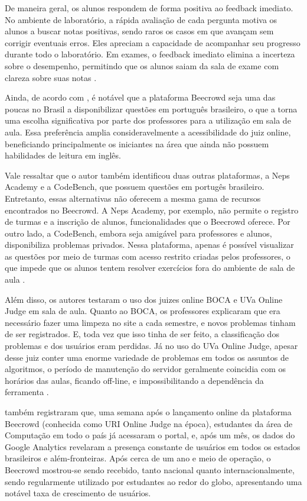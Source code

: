De maneira geral, os alunos respondem de forma positiva ao feedback imediato. No ambiente de laboratório, a rápida avaliação de cada pergunta motiva os alunos a buscar notas positivas, sendo raros os casos em que avançam sem corrigir eventuais erros. Eles apreciam a capacidade de acompanhar seu progresso durante todo o laboratório. Em exames, o feedback imediato elimina a incerteza sobre o desempenho, permitindo que os alunos saiam da sala de exame com clareza sobre suas notas \cite[p.~49]{lobbharlow}. 

Ainda, de acordo com \textcite[p.~24]{lima2023}, é notável que a plataforma Beecrowd seja uma das poucas no Brasil a disponibilizar questões em português brasileiro, o que a torna uma escolha significativa por parte dos professores para a utilização em sala de aula. Essa preferência amplia consideravelmente a acessibilidade do juiz online, beneficiando principalmente os iniciantes na área que ainda não possuem habilidades de leitura em inglês. 

Vale ressaltar que o autor também identificou duas outras plataformas, a Neps Academy e a CodeBench, que possuem questões em portugês brasileiro. Entretanto, essas alternativas não oferecem a mesma gama de recursos encontrados no Beecrowd. A Neps Academy, por exemplo, não permite o registro de turmas e a inscrição de alunos, funcionalidades que o Beecrowd oferece. Por outro lado, a CodeBench, embora seja amigável para professores e alunos, disponibiliza problemas privados. Nessa plataforma, apenas é possível visualizar as questões por meio de turmas com acesso restrito criadas pelos professores, o que impede que os alunos tentem resolver exercícios fora do ambiente de sala de aula \cite[p.~41]{lima2023}. 

Além disso, os autores \textcite[p.~41]{beztonin2012} testaram o uso dos juizes online BOCA e UVa Online Judge em sala de aula. Quanto ao BOCA, os professores explicaram que era necessário fazer uma limpeza no site a cada semestre, e novos problemas tinham de ser registrados. E, toda vez que isso tinha de ser feito, a classificação dos problemas e dos usuários eram perdidas. Já no uso do UVa Online Judge, apesar desse juiz conter uma enorme variedade de problemas em todos os assuntos de algoritmos, o período de manutenção do servidor geralmente coincidia com os horários das aulas, ficando off-line, e impossibilitando a dependência da ferramenta \cite[p.~1]{beztonin2012}. 

\textcite[p.~248]{beztonin2014} também registraram que, uma semana após o lançamento online da plataforma Beecrowd (conhecida como URI Online Judge na época), estudantes da área de Computação em todo o país já acessaram o portal, e, após um mês, os dados do Google Analytics revelaram a presença constante de usuários em todos os estados brasileiros e além-fronteiras. Após cerca de um ano e meio de operação, o Beecrowd mostrou-se sendo recebido, tanto nacional quanto internacionalmente, sendo regularmente utilizado por estudantes ao redor do globo, apresentando uma notável taxa de crescimento de usuários. 

